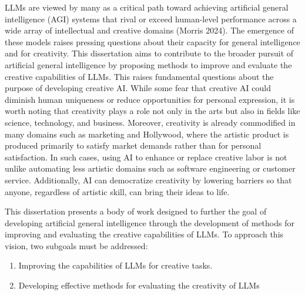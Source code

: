 \documentclass[phd,electronic,oneside,twosidetoc,letterpaper,chaptercenter,parttop,lof]{byumsphd}
\begin{document}
LLMs are viewed by many as a critical path toward achieving artificial general intelligence (AGI) systems that rival or exceed human-level performance across a wide array of intellectual and creative domains (Morris 2024). 
The emergence of these models raises pressing questions about their capacity for general intelligence and for creativity. 
This dissertation aims to contribute to the broader pursuit of artificial general intelligence by proposing methods to improve and evaluate the creative capabilities of LLMs. 
This raises fundamental questions about the purpose of developing creative AI. 
While some fear that creative AI could diminish human uniqueness or reduce opportunities for personal expression, it is worth noting that creativity plays a role not only in the arts but also in fields like science, technology, and business. 
Moreover, creativity is already commodified in many domains such as marketing and Hollywood, where the artistic product is produced primarily to satisfy market demands rather than for personal satisfaction. 
In such cases, using AI to enhance or replace creative labor is not unlike automating less artistic domains such as software engineering or customer service. 
Additionally, AI can democratize creativity by lowering barriers so that anyone, regardless of artistic skill, can bring their ideas to life.

This dissertation presents a body of work designed to further the goal of developing artificial general intelligence through the development of methods for improving and evaluating the creative capabilities of LLMs. 
To approach this vision, two subgoals must be addressed:
\begin{enumerate}
    \item Improving the capabilities of LLMs for creative tasks.
    \item Developing effective methods for evaluating the creativity of LLMs
\end{enumerate}
\end{document}
